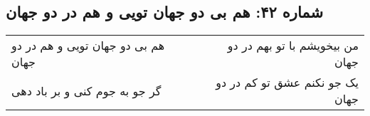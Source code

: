 \begin{center}
\section*{شماره ۴۲: هم بی دو جهان تویی و هم در دو جهان}
\label{sec:042}
\begin{longtable}{l p{0.5cm} r}
هم بی دو جهان تویی و هم در دو جهان
&&
من بیخویشم با تو بهم در دو جهان
\\
گر جو به جوم کنی و بر باد دهی
&&
یک جو نکنم عشق تو کم در دو جهان
\\
\end{longtable}
\end{center}
